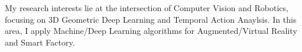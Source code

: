 


\begin{cventries}

\cvtext
{ %
\begin{cvitems}
My research interests lie at the intersection of Computer Vision and Robotics, focusing on 3D Geometric Deep Learning and Temporal Action Anaylsis. 
In this area, I apply Machine/Deep Learning algorithms for Augmented/Virtual Reality and Smart Factory.
\end{cvitems}
}


\end{cventries}
